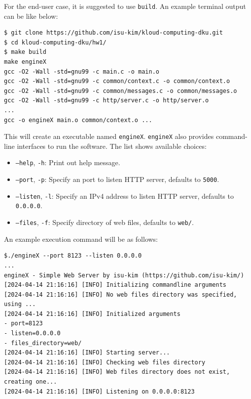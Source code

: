 \documentclass{homework}
\begin{document}
For the end-user case, it is suggested to use \texttt{build}. An example terminal output can be like below:
\\
\begin{center}
\begin{code}
\begin{verbatim}
$ git clone https://github.com/isu-kim/kloud-computing-dku.git
$ cd kloud-computing-dku/hw1/
$ make build
make engineX
gcc -O2 -Wall -std=gnu99 -c main.c -o main.o
gcc -O2 -Wall -std=gnu99 -c common/context.c -o common/context.o
gcc -O2 -Wall -std=gnu99 -c common/messages.c -o common/messages.o
gcc -O2 -Wall -std=gnu99 -c http/server.c -o http/server.o
...
gcc -o engineX main.o common/context.o ...
\end{verbatim}
\end{code}
\end{center}

This will create an executable named \texttt{engineX}. \texttt{engineX} also provides command-line interfaces to run the software. The list shows available choices:

\begin{itemize}
    \item \texttt{--help}, \texttt{-h}: Print out help message.
    \item \texttt{--port}, \texttt{-p}: Specify an port to listen HTTP server, defaults to \texttt{5000}.
    \item \texttt{--listen}, \texttt{-l}: Specify an IPv4 address to listen HTTP server, defaults to \texttt{0.0.0.0}.
    \item \texttt{--files}, \texttt{-f}: Specify directory of web files, defaults to \texttt{web/}.
\end{itemize}

An example execution command will be as follows:
\\
\begin{center}
\begin{code}
\begin{verbatim}
$./engineX --port 8123 --listen 0.0.0.0       
...
engineX - Simple Web Server by isu-kim (https://github.com/isu-kim/)
[2024-04-14 21:16:16] [INFO] Initializing commandline arguments
[2024-04-14 21:16:16] [INFO] No web files directory was specified, using ...
[2024-04-14 21:16:16] [INFO] Initialized arguments
- port=8123
- listen=0.0.0.0
- files_directory=web/
[2024-04-14 21:16:16] [INFO] Starting server...
[2024-04-14 21:16:16] [INFO] Checking web files directory
[2024-04-14 21:16:16] [INFO] Web files directory does not exist, creating one...
[2024-04-14 21:16:16] [INFO] Listening on 0.0.0.0:8123
\end{verbatim}
\end{code}
\end{center}
\end{document}
